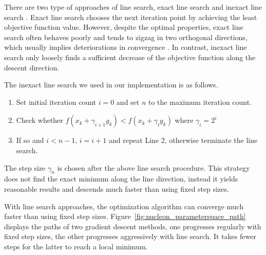 There are two type of approaches of line search, exact line search and inexact line search \cite{vrahatis_class_2000}.
Exact line search chooses the next iteration point by achieving the least objective function value. However, despite the optimal properties, exact line search often behaves poorly and tends to zigzag in two orthogonal directions, which usually implies deteriorations in convergence \cite{zhou_gradient_2006}.
In contrast, inexact line search only loosely finds a sufficient decrease of the objective function along the descent direction.

The inexact line search we used in our implementation is as follows.

\begin{enumerate}
	\item Set initial iteration count $ i=0 $ and set $ n $ to the maximum iteration count.
	\item Check whether $ f(x_{k}+\gamma_{i+1} g_{k}) < f(x_{k}+\gamma_{i} g_{k}) $ where $ \gamma_{i}=2^{i} $
	\item If so and $ i<n-1 $, $ i=i+1 $ and repeat Line 2, otherwise terminate the line search.
\end{enumerate}

The step size $ \gamma_{n} $ is chosen after the above line search procedure.
This strategy does not find the exact minimum along the line direction, instead it yields reasonable results and descends much faster than using fixed step sizes.

With line search approaches, the optimization algorithm can converge much faster than using fixed step sizes. Figure~\ref{fig:nucleon_parameterspace_path} displays the paths of two gradient descent methods, one progresses regularly with fixed step sizes, the other progresses aggressively with line search. It takes fewer steps for the latter to reach a local minimum.

